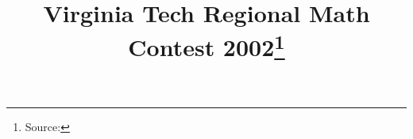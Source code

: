 \documentclass[10pt]{article}
\begin{document}
\title{Virginia Tech Regional Math Contest 2002\footnote{Source: \source}}
\author{\vspace{-2ex}}
\date{\vspace{-6ex}} %
\maketitle







\end{document}
